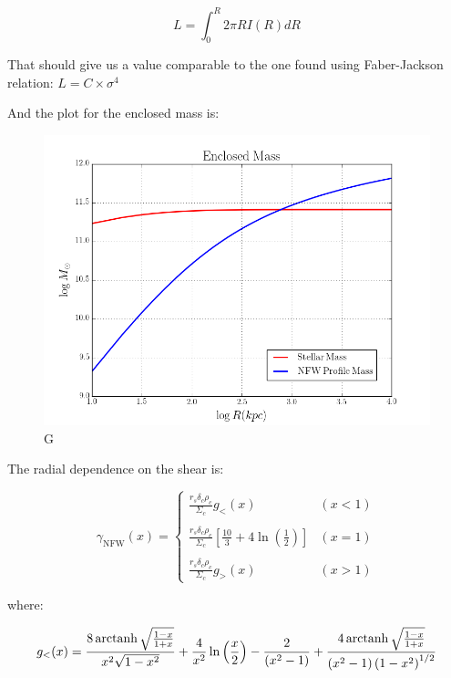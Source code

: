 \begin{equation}
L=\int_{0}^{R}2\pi RI(R)dR
\end{equation}

That should give us a value comparable to the one found using Faber-Jackson relation: $L=C\times\sigma^{4}$

And the plot for the enclosed mass is:

\begin{figure}[H]
\centering
\includegraphics[width=12cm]{images/Enclosed Mass.png}
\caption[M]{G}
\end{figure}

The radial dependence on the shear is:

\begin{equation}
\gamma_{\text{NFW}}(x) = \left\lbrace
\begin{array}{lll}
\frac{r_{s}\delta_{c}\rho_{c}}{\Sigma_c}g_{<}(x) & (x<1)\\\\
\frac{r_{s}\delta_{c}\rho_{c}}{\Sigma_c}\left[\frac{10}{3}+4 \ln \left(\frac{1}{2}\right)\right] & (x=1)\\\\
\frac{r_{s}\delta_{c}\rho_{c}}{\Sigma_c}g_{>}(x) & (x>1)
\end{array}
\right.
\end{equation} 

where: 

\begin{equation}
g_{<}(x)=\frac{8 \operatorname{arctanh} \sqrt{\frac{1-x}{1+x}}}{x^{2}\sqrt{1-x^{2}}}+\frac{4}{x^{2}} \ln \left(\frac{x}{2}\right)-\frac{2}{\left(x^{2}-1\right)}+\frac{4 \operatorname{arctanh} \sqrt{\frac{1-x}{1+x}}}{\left(x^{2}-1\right)\left(1-x^{2}\right)^{1/2}}
\end{equation}

